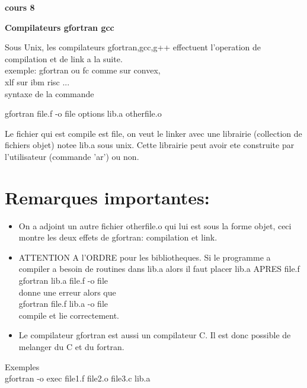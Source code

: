 \documentclass[12pt]{article}
\begin{document}
\begin{center}{\bf \Large cours 8 } 
\end{center}



\begin{center}{\bf \Large Compilateurs gfortran gcc  } \end{center}



Sous Unix, les compilateurs gfortran,gcc,g++ effectuent l'operation
de compilation et de link a la suite. \\
exemple: gfortran ou fc comme sur convex, \\
xlf sur ibm risc ... \\
syntaxe de la commande 

gfortran file.f -o file options lib.a otherfile.o


Le fichier qui est compile est file, on veut le linker avec
une librairie (collection de fichiers objet) notee lib.a sous unix.
Cette librairie peut avoir ete construite par l'utilisateur (commande
'ar') ou non. 

\section{Remarques importantes:}

\begin{itemize}
\item On a adjoint un autre fichier otherfile.o qui lui est
sous la forme objet, ceci montre les deux effets de gfortran: compilation
et link.

\item ATTENTION A l'ORDRE pour les bibliotheques. Si le
programme a compiler a besoin de routines dans lib.a alors
il faut placer lib.a APRES file.f \\
gfortran lib.a file.f -o file \\
donne une erreur alors que \\
gfortran file.f lib.a -o file \\
compile et lie correctement.

\item Le compilateur gfortran est aussi un compilateur C. Il est donc
possible de melanger du C et du fortran.

\end{itemize}

Exemples \\

gfortran -o exec file1.f file2.o file3.c lib.a
\end{document}
